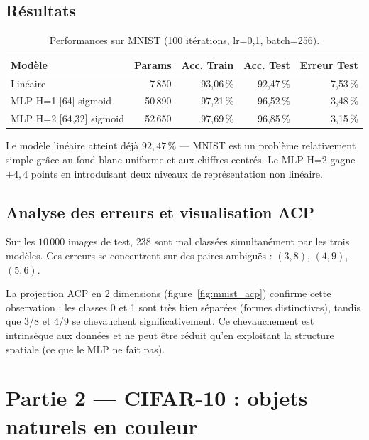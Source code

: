 \documentclass[a4paper,11pt]{article}
\begin{document}
\subsection{Résultats}

\begin{table}[H]
\centering
\caption{Performances sur MNIST (100 itérations, lr=0{,}1, batch=256).}
\begin{tabular}{lrrrr}
\toprule
\textbf{Modèle} & \textbf{Params} & \textbf{Acc. Train} & \textbf{Acc. Test} & \textbf{Erreur Test} \\
\midrule
Linéaire               & 7\,850   & 93{,}06\,\% & 92{,}47\,\% & 7{,}53\,\% \\
MLP H=1 [64] sigmoid   & 50\,890  & 97{,}21\,\% & 96{,}52\,\% & 3{,}48\,\% \\
MLP H=2 [64,32] sigmoid & 52\,650 & 97{,}69\,\% & 96{,}85\,\% & 3{,}15\,\% \\
\bottomrule
\end{tabular}
\label{tab:mnist}
\end{table}

Le modèle linéaire atteint déjà $92{,}47\,\%$ — MNIST est un problème relativement simple
grâce au fond blanc uniforme et aux chiffres centrés. Le MLP H=2 gagne $+4{,}4$ points
en introduisant deux niveaux de représentation non linéaire.

\subsection{Analyse des erreurs et visualisation ACP}

Sur les $10\,000$ images de test, 238 sont mal classées simultanément par les trois modèles.
Ces erreurs se concentrent sur des paires ambiguës : $(3,8)$, $(4,9)$, $(5,6)$.

La projection ACP en 2 dimensions (figure~\ref{fig:mnist_acp}) confirme cette observation :
les classes 0 et 1 sont très bien séparées (formes distinctives),
tandis que 3/8 et 4/9 se chevauchent significativement.
Ce chevauchement est intrinsèque aux données et ne peut être réduit
qu'en exploitant la structure spatiale (ce que le MLP ne fait pas).

\section{Partie 2 — CIFAR-10 : objets naturels en couleur}
\end{document}
